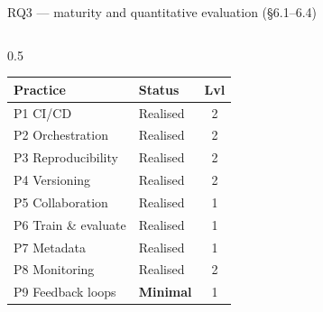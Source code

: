 \documentclass[aspectratio=169,10pt]{beamer}
\begin{document}
\begin{frame}{RQ3 --- maturity and quantitative evaluation \hfill\small(\S6.1--6.4)}
  \begin{columns}[c]
    \begin{column}{0.5\textwidth}
      \footnotesize
      \begin{tabular}{llc}
        \toprule
        Practice & Status & Lvl \\
        \midrule
        P1 CI/CD            & Realised & 2 \\
        P2 Orchestration    & Realised & 2 \\
        P3 Reproducibility  & Realised & 2 \\
        P4 Versioning       & Realised & 2 \\
        P5 Collaboration    & Realised & 1 \\
        P6 Train \& evaluate& Realised & 1 \\
        P7 Metadata         & Realised & 1 \\
        P8 Monitoring       & Realised & 2 \\
        P9 Feedback loops   & \textbf{Minimal} & 1 \\
        \bottomrule
      \end{tabular}
    \end{column}
  \end{columns}
\end{frame}
\end{document}
